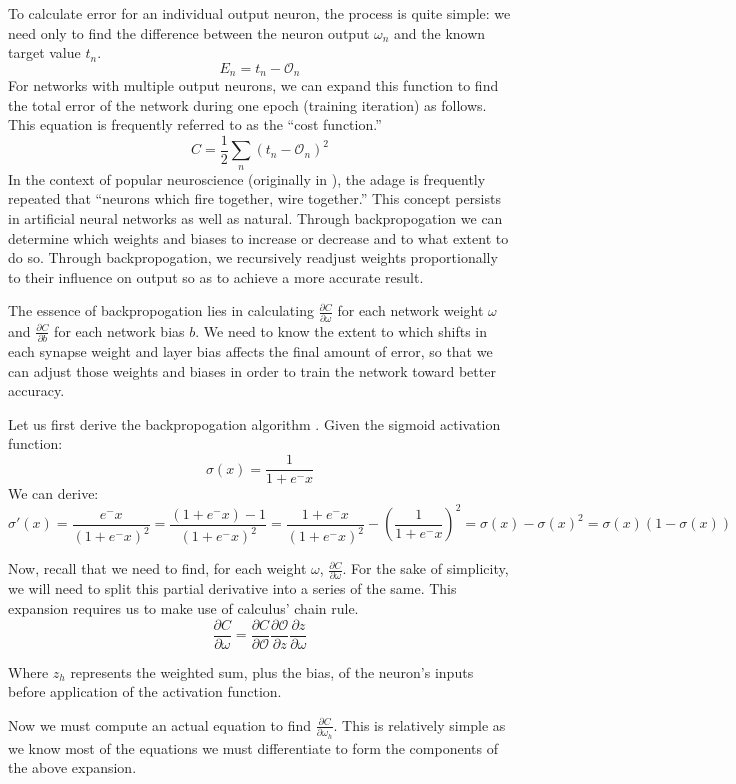 \documentclass{article}
\begin{document}
To calculate error for an individual output neuron, the process is quite simple: we need only to find the difference between the neuron output $\omega_n$ and the known target value $t_n$.
$$E_n=t_n-\mathcal{O}_n$$
For networks with multiple output neurons, we can expand this function to find the total error of the network during one epoch (training iteration) as follows. This equation is frequently referred to as the ``cost function.'' \cite{mediummlbasics}
$$C=\frac{1}{2}\sum_n(t_n-\mathcal{O}_n)^2$$
In the context of popular neuroscience (originally in \cite{neuronsfire}), the adage is frequently repeated that ``neurons which fire together, wire together.'' This concept persists in artificial neural networks as well as natural. Through backpropogation we can determine which weights and biases to increase or decrease and to what extent to do so. Through backpropogation, we recursively readjust weights proportionally to their influence on output so as to achieve a more accurate result.

The essence of backpropogation lies in calculating $\frac{\partial{C}}{\partial{\omega}}$ for each network weight $\omega$ and $\frac{\partial{C}}{\partial{b}}$ for each network bias $b$. We need to know the extent to which shifts in each synapse weight and layer bias affects the final amount of error, so that we can adjust those weights and biases in order to train the network toward better accuracy.

Let us first derive the backpropogation algorithm \cite{derivebackprop}. Given the sigmoid activation function:
$$\sigma(x)=\frac{1}{1+e^-x}$$
We can derive:
$$\sigma'(x)=\frac{e^-x}{(1+e^-x)^2}=\frac{(1+e^-x)-1}{(1+e^-x)^2}=\frac{1+e^-x}{(1+e^-x)^2}-\left(\frac{1}{1+e^-x}\right)^2=\sigma(x)-\sigma(x)^2=\sigma(x)(1-\sigma(x))$$

Now, recall that we need to find, for each weight $\omega$, $\frac{\partial{C}}{\partial{\omega}}$. For the sake of simplicity, we will need to split this partial derivative into a series of the same. This expansion requires us to make use of calculus' chain rule.
$$\frac{\partial{C}}{\partial{\omega}}=\frac{ \partial{C} }{ \partial{\mathcal{O}} }
                                        \frac{ \partial{\mathcal{O}} }{ \partial{z} }
                                         \frac{ \partial{z} }{ \partial{\omega} }$$

Where $z_h$ represents the weighted sum, plus the bias, of the neuron's inputs before application of the activation function.

Now we must compute an actual equation to find $\frac{\partial{C}}{\partial{\omega_h}}$. This is relatively simple as we know most of the equations we must differentiate to form the components of the above expansion.
\end{document}
